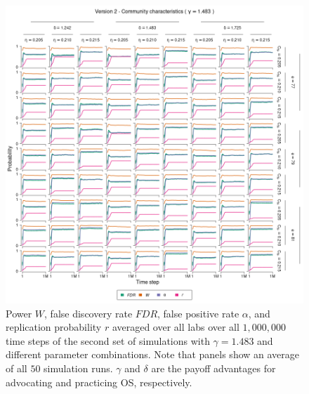 \documentclass[meta, authordate,issue]{jote-new-article}
\begin{document}
\begin{figure}
  \begin{fullwidth}
    \centering
    \includegraphics[width=\textwidth]{v2_cha_plot_sens_payypro1.483.png}
    \caption{Power $W$, false discovery rate $FDR$, false positive rate $\alpha$, and replication probability $r$ averaged over all labs over all $1,000,000$ time steps of the second set of simulations with $\gamma=1.483$ and different parameter combinations. Note that panels show an average of all $50$ simulation runs. $\gamma$ and $\delta$ are the payoff advantages for advocating and practicing OS, respectively.}
    \label{fig:v2_cha_plot_sens_payypro1.483}
  \end{fullwidth}
\end{figure}
%
%
\end{document}
